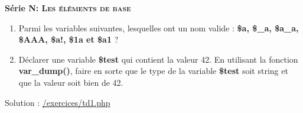 \documentclass[10pt,a4paper,notitlepage]{article}
\begin{document}
	
	\begin{center}
		\large{\textbf{Série N: \textsc{Les éléments de base}}}
	\end{center}
	\begin{definition}
		\hspace{2ex} 
		\begin{enumerate}
			\item Parmi les variables suivantes, lesquelles ont un nom valide : \textbf{{\color{dkgreen} \$a, \$\_a, \$a\_a, \$AAA, \$a!, \$1a et \$a1 }}?
			\item Déclarer une variable \textbf{{\color{dkgreen} \$test}} qui contient la valeur 42. En utilisant la fonction \textbf{{\color{violet} var\_dump()}}, faire en sorte que le type de la variable \textbf{{\color{dkgreen} \$test}} soit string et que la valeur soit bien de 42.
		\end{enumerate}
		Solution : \href{https://exercicesdephp.000webhostapp.com/exercices/td1.php}{\color{blue} /exercices/td1.php}
	\end{definition}
	
\end{document}
